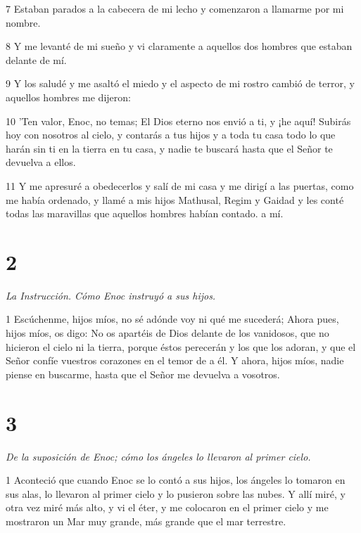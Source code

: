 \par 7 Estaban parados a la cabecera de mi lecho y comenzaron a llamarme por mi nombre.

\par 8 Y me levanté de mi sueño y vi claramente a aquellos dos hombres que estaban delante de mí.

\par 9 Y los saludé y me asaltó el miedo y el aspecto de mi rostro cambió de terror, y aquellos hombres me dijeron:

\par 10 'Ten valor, Enoc, no temas; El Dios eterno nos envió a ti, y ¡he aquí! Subirás hoy con nosotros al cielo, y contarás a tus hijos y a toda tu casa todo lo que harán sin ti en la tierra en tu casa, y nadie te buscará hasta que el Señor te devuelva a ellos.

\par 11 Y me apresuré a obedecerlos y salí de mi casa y me dirigí a las puertas, como me había ordenado, y llamé a mis hijos Mathusal, Regim y Gaidad y les conté todas las maravillas que aquellos hombres habían contado. a mí.

\chapter{2}

\par \textit{La Instrucción. Cómo Enoc instruyó a sus hijos.}

\par 1 Escúchenme, hijos míos, no sé adónde voy ni qué me sucederá; Ahora pues, hijos míos, os digo: No os apartéis de Dios delante de los vanidosos, que no hicieron el cielo ni la tierra, porque éstos perecerán y los que los adoran, y que el Señor confíe vuestros corazones en el temor de a él. Y ahora, hijos míos, nadie piense en buscarme, hasta que el Señor me devuelva a vosotros.

\chapter{3}

\par \textit{De la suposición de Enoc; cómo los ángeles lo llevaron al primer cielo.}

\par 1 Aconteció que cuando Enoc se lo contó a sus hijos, los ángeles lo tomaron en sus alas, lo llevaron al primer cielo y lo pusieron sobre las nubes. Y allí miré, y otra vez miré más alto, y vi el éter, y me colocaron en el primer cielo y me mostraron un Mar muy grande, más grande que el mar terrestre.

